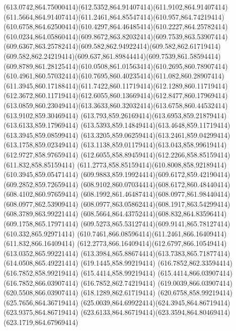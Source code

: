 {{	\curveto(613.0742,864.75000414)(612.5352,864.91407414)(611.9102,864.91407414)
	\curveto(611.5664,864.91407414)(611.2461,864.85547414)(610.957,864.74219414)
	\curveto(610.6758,864.62500414)(610.4297,864.46485414)(610.2227,864.25782414)
	\curveto(610.0234,864.05860414)(609.8672,863.82032414)(609.7539,863.53907414)
	\curveto(609.6367,863.25782414)(609.582,862.94922414)(609.582,862.61719414)
	\curveto(609.582,862.24219414)(609.637,861.89844414)(609.7539,861.58594414)
	\curveto(609.8789,861.28125414)(610.0508,861.01563414)(610.2695,860.78907414)
	\curveto(610.4961,860.57032414)(610.7695,860.40235414)(611.082,860.28907414)
	\curveto(611.3945,860.17188414)(611.7422,860.11719414)(612.1289,860.11719414)
	\curveto(612.3672,860.11719414)(612.6055,860.13669414)(612.8477,860.17969414)
	\curveto(613.0859,860.23049414)(613.3633,860.32032414)(613.6758,860.44532414)
	\lineto(613.9102,859.30469414)
	\curveto(613.793,859.26169414)(613.6953,859.21879414)(613.6133,859.17969414)
	\curveto(613.5393,859.14849414)(613.4648,859.11719414)(613.3945,859.08599414)
	\curveto(613.3205,859.06259414)(613.2461,859.04299414)(613.1758,859.02349414)
	\curveto(613.1138,859.01179414)(613.043,858.99619414)(612.9727,858.97659414)
	\curveto(612.6055,858.89459414)(612.2266,858.85159414)(611.832,858.85159414)
	\curveto(611.2773,858.85159414)(610.8008,858.92189414)(610.3945,859.05471414)
	\curveto(609.9883,859.19924414)(609.6172,859.42190414)(609.2852,859.72659414)
	\curveto(608.9102,860.07034414)(608.6172,860.48440414)(608.4102,860.97659414)
	\curveto(608.1992,861.46487414)(608.0977,861.98440414)(608.0977,862.53909414)
	\curveto(608.0977,863.05862414)(608.1917,863.54299414)(608.3789,863.99221414)
	\curveto(608.5664,864.43752414)(608.832,864.83596414)(609.1758,865.17971414)
	\curveto(609.5273,865.53127414)(609.9141,865.78127414)(610.332,865.92971414)
	\curveto(610.7461,866.08596414)(611.2461,866.16409414)(611.832,866.16409414)
	\curveto(612.2773,866.16409414)(612.6797,866.10549414)(613.0352,865.99221414)
	\curveto(613.3984,865.88674414)(613.7383,865.71877414)(614.0508,865.49221414)
	\closepath
	\moveto(619.1445,858.99219414)
	\lineto(616.7852,862.33594414)
	\lineto(616.7852,858.99219414)
	\lineto(615.4414,858.99219414)
	\lineto(615.4414,866.03907414)
	\lineto(616.7852,866.03907414)
	\lineto(616.7852,862.74219414)
	\lineto(619.0039,866.03907414)
	\lineto(620.5508,866.03907414)
	\lineto(618.1289,862.61719414)
	\lineto(620.6758,858.99219414)
	\closepath
	\moveto(625.7656,864.36719414)
	\curveto(625.0039,864.69922414)(624.3945,864.86719414)(623.9375,864.86719414)
	\curveto(623.6133,864.86719414)(623.3594,864.80469414)(623.1719,864.67969414)
}}
